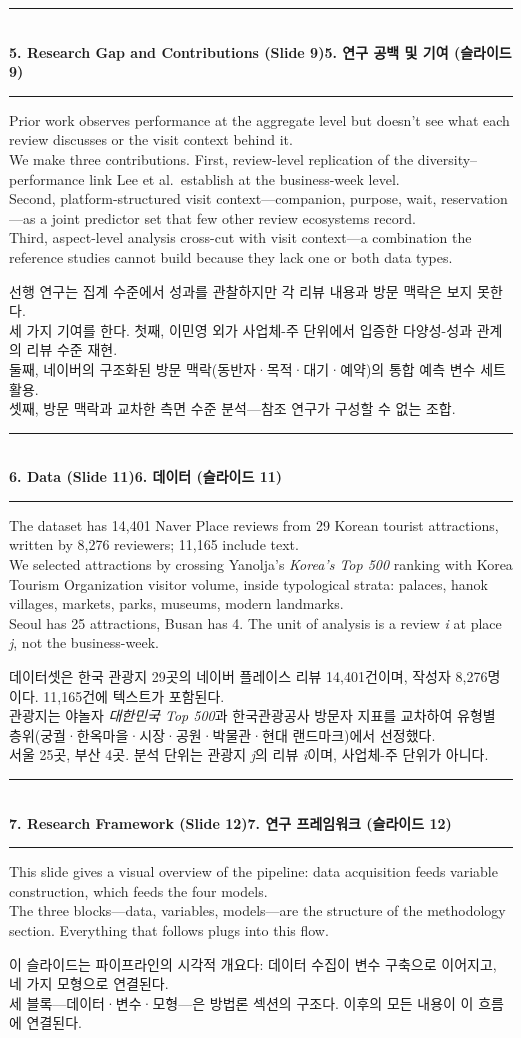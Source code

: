 \documentclass[10pt,a4paper]{article}
\newcommand{\sechead}[2]{%
  \vspace{6pt}%
  \noindent\rule{\linewidth}{0.6pt}\\[1pt]
  {\small\bfseries #1\hfill #2}\\[-3pt]
  \rule{\linewidth}{0.4pt}\par\vspace{2pt}%
}
\newcommand{\sent}[1]{#1\\[5pt]}
\newcommand{\bilingual}[2]{%
  \noindent%
  \begin{minipage}[t]{0.485\linewidth}
    \small #1
  \end{minipage}\hfill\vrule\hfill%
  \begin{minipage}[t]{0.483\linewidth}
    \small #2
  \end{minipage}\par\vspace{4pt}%
}
\begin{document}
\sechead{5. Research Gap and Contributions (Slide 9)}{5. 연구 공백 및 기여 (슬라이드 9)}
\bilingual{%
  \sent{Prior work observes performance at the aggregate level but doesn't see what each review discusses or the visit context behind it.}
  \sent{We make three contributions. First, review-level replication of the diversity--performance link Lee et al.\ establish at the business-week level.}
  \sent{Second, platform-structured visit context---companion, purpose, wait, reservation---as a joint predictor set that few other review ecosystems record.}
  \sent{Third, aspect-level analysis cross-cut with visit context---a combination the reference studies cannot build because they lack one or both data types.}
}{%
  \sent{선행 연구는 집계 수준에서 성과를 관찰하지만 각 리뷰 내용과 방문 맥락은 보지 못한다.}
  \sent{세 가지 기여를 한다. 첫째, 이민영 외가 사업체-주 단위에서 입증한 다양성-성과 관계의 리뷰 수준 재현.}
  \sent{둘째, 네이버의 구조화된 방문 맥락(동반자·목적·대기·예약)의 통합 예측 변수 세트 활용.}
  \sent{셋째, 방문 맥락과 교차한 측면 수준 분석---참조 연구가 구성할 수 없는 조합.}
}

\sechead{6. Data (Slide 11)}{6. 데이터 (슬라이드 11)}
\bilingual{%
  \sent{The dataset has 14,401 Naver Place reviews from 29 Korean tourist attractions, written by 8,276 reviewers; 11,165 include text.}
  \sent{We selected attractions by crossing Yanolja's \textit{Korea's Top 500} ranking with Korea Tourism Organization visitor volume, inside typological strata: palaces, hanok villages, markets, parks, museums, modern landmarks.}
  \sent{Seoul has 25 attractions, Busan has 4. The unit of analysis is a review \textit{i} at place \textit{j}, not the business-week.}
}{%
  \sent{데이터셋은 한국 관광지 29곳의 네이버 플레이스 리뷰 14,401건이며, 작성자 8,276명이다. 11,165건에 텍스트가 포함된다.}
  \sent{관광지는 야놀자 \textit{대한민국 Top 500}과 한국관광공사 방문자 지표를 교차하여 유형별 층위(궁궐·한옥마을·시장·공원·박물관·현대 랜드마크)에서 선정했다.}
  \sent{서울 25곳, 부산 4곳. 분석 단위는 관광지 \textit{j}의 리뷰 \textit{i}이며, 사업체-주 단위가 아니다.}
}

\sechead{7. Research Framework (Slide 12)}{7. 연구 프레임워크 (슬라이드 12)}
\bilingual{%
  \sent{This slide gives a visual overview of the pipeline: data acquisition feeds variable construction, which feeds the four models.}
  \sent{The three blocks---data, variables, models---are the structure of the methodology section. Everything that follows plugs into this flow.}
}{%
  \sent{이 슬라이드는 파이프라인의 시각적 개요다: 데이터 수집이 변수 구축으로 이어지고, 네 가지 모형으로 연결된다.}
  \sent{세 블록---데이터·변수·모형---은 방법론 섹션의 구조다. 이후의 모든 내용이 이 흐름에 연결된다.}
}
\end{document}
